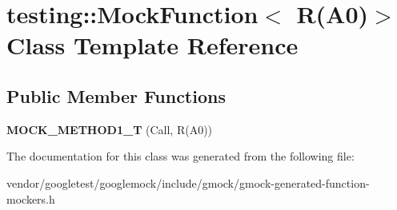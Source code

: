 \hypertarget{classtesting_1_1_mock_function_3_01_r_07_a0_08_4}{}\section{testing\+:\+:Mock\+Function$<$ R(A0)$>$ Class Template Reference}
\label{classtesting_1_1_mock_function_3_01_r_07_a0_08_4}
\subsection*{Public Member Functions}
\begin{DoxyCompactItemize}
\item 
\mbox{\label{classtesting_1_1_mock_function_3_01_r_07_a0_08_4_a6a22e7e14b53d2df30bef4404b41fade}} 
{\bfseries M\+O\+C\+K\+\_\+\+M\+E\+T\+H\+O\+D1\+\_\+T} (Call, R(A0))
\end{DoxyCompactItemize}


The documentation for this class was generated from the following file\+:\begin{DoxyCompactItemize}
\item 
vendor/googletest/googlemock/include/gmock/gmock-\/generated-\/function-\/mockers.\+h\end{DoxyCompactItemize}
